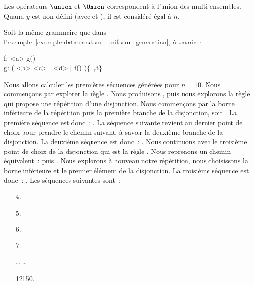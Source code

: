 Les opérateurs $\union$ et $\Union$ correspondent à l'union des multi-ensembles.
Quand $y$ est non défini (avec \code{*} et \code{+}), il est considéré égal à
$n$.

\begin{example}
\label{example:data:bounded_exhaustive_generation}

Soit la même grammaire que dans
l'exemple~\ref{example:data:random_uniform_generation}, à savoir~:

\begin{pre}
f: <a> g() \\
g: ( <b> <c> | <d> | f() )\{1,3\}
\end{pre}

Nous allons calculer les premières séquences générées pour $n = 10$. Nous
commençons par explorer la règle . Nous produisons , puis nous
explorons la règle  qui propose une répétition d'une disjonction.  Nous
commençons par la borne inférieure de la répétition puis la première branche de
la disjonction, soit . La première séquence est donc~: . La séquence suivante revient au dernier point de choix pour prendre le
chemin suivant, à savoir la deuxième branche de la disjonction. La deuxième
séquence est donc~: . Nous continuons avec le troisième point de
choix de la disjonction qui est la règle . Nous reprenons un chemin
équivalent~:  puis . Nous explorons à nouveau notre
répétition, nous choisissons la borne inférieure et le premier élément de la
disjonction. La troisième séquence est donc~: . Les
séquences suivantes sont~:

\begin{enumerate}

\item[\phantom{0000}4.] 

\item[\phantom{0000}5.] 

\item[\phantom{0000}6.] 

\item[\phantom{0000}7.] 

\item[\phantom{000}…] …

\item[12150.] 

\end{enumerate}

\end{example}

